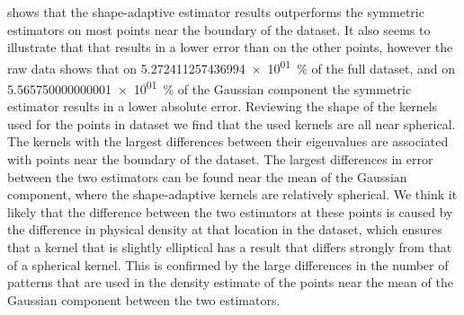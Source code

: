 		





		 shows that the shape-adaptive estimator results outperforms the symmetric estimators on most points near the boundary of the dataset. It also seems to illustrate that that \mbe results in a lower error than \sambe on the other points, however the raw data shows that on \SI{5.272411257436994e+01}{\percent} of the full dataset, and on \SI{5.565750000000001e+01}{\percent} of the Gaussian component the symmetric estimator results in a lower absolute error.
		Reviewing the shape of the kernels used for the points in dataset \ferdosiOne we find that the used kernels are all near spherical. The kernels with the largest differences between their eigenvalues are associated with points near the boundary of the dataset. 
		The largest differences in error between the two estimators can be found near the mean of the Gaussian component, where the shape-adaptive kernels are relatively spherical. We think it likely that the difference between the two estimators at these points is caused by the difference in physical density at that location in the dataset, which ensures that a kernel that is slightly elliptical has a result that differs strongly from that of a spherical kernel. This is confirmed by the large differences in the number of patterns that are used in the density estimate of the points near the mean of the Gaussian component between the two estimators. 

